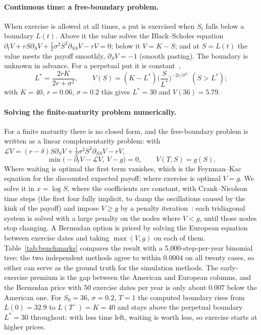 \paragraph{Continuous time: a free-boundary problem.}
When exercise is allowed at all times, a put is exercised when $S_t$ falls below a boundary
$L(t)$. Above it the value solves the Black--Scholes equation
$\partial_tV+rS\partial_SV+\tfrac12\sigma^2S^2\partial_{SS}V-rV=0$; below it $V=K-S$; and at
$S=L(t)$ the value meets the payoff smoothly, $\partial_SV=-1$ (smooth pasting). The
boundary is unknown in advance. For a perpetual put it is constant~\cite{shreve2},
\begin{equation}
L^*=\frac{2rK}{2r+\sigma^2},\qquad V(S)=(K-L^*)\Big(\frac{S}{L^*}\Big)^{-2r/\sigma^2}\ \ (S>L^*);
\end{equation}
with $K=40$, $r=0.06$, $\sigma=0.2$ this gives $L^*=30$ and $V(36)=5.79$.

\paragraph{Solving the finite-maturity problem numerically.}
For a finite maturity there is no closed form, and the free-boundary problem is written as
a linear complementarity problem: with $\mathcal L V=(r-\delta)S\partial_SV+\tfrac12\sigma^2S^2\partial_{SS}V-rV$,
\begin{equation}
\min\big(-\partial_tV-\mathcal LV,\ V-g\big)=0,\qquad V(T,S)=g(S).
\end{equation}
Where waiting is optimal the first term vanishes, which is the Feynman--Kac equation for
the discounted expected payoff; where exercise is optimal $V=g$. We solve it in
$x=\log S$, where the coefficients are constant, with Crank--Nicolson time steps (the first
four fully implicit, to damp the oscillations caused by the kink of the payoff) and impose
$V\ge g$ by a penalty iteration~\cite{forsyth2002}: each tridiagonal system is solved with
a large penalty on the nodes where $V<g$, until those nodes stop changing. A Bermudan
option is priced by solving the European equation between exercise dates and taking
$\max(V,g)$ on each of them. Table~\ref{tab:benchmarks} compares the result with a
5{,}000-step-per-year binomial tree: the two independent methods agree to within $0.0004$
on all twenty cases, so either can serve as the ground truth for the simulation methods.
The early-exercise premium is the gap between the American and European columns, and the
Bermudan price with 50 exercise dates per year is only about $0.007$ below the American
one. For $S_0=36$, $\sigma=0.2$, $T=1$ the computed boundary rises from $L(0)=32.9$ to
$L(T^-)=K=40$ and stays above the perpetual boundary $L^*=30$ throughout: with less time
left, waiting is worth less, so exercise starts at higher prices.


